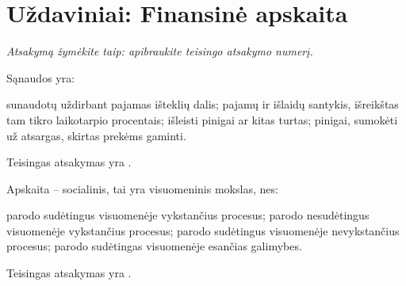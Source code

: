 

\chapter{Uždaviniai: Finansinė apskaita}


\begin{tasks}
  
  \emph{Atsakymą žymėkite taip: apibraukite teisingo atsakymo numerį.}

  \begin{task}
    \begin{condition}
      Sąnaudos yra:
      \begin{enumerate}
         sunaudotų uždirbant pajamas išteklių dalis;
         pajamų ir išlaidų santykis, išreikštas tam tikro
          laikotarpio procentais;
         išleisti pinigai ar kitas turtas;
         pinigai, sumokėti už atsargas, skirtas prekėms
          gaminti.
      \end{enumerate}
    \end{condition}
    \begin{solution}
      Teisingas atsakymas yra .
    \end{solution}
  \end{task}

  \begin{task}
    \begin{condition}
      Apskaita – socialinis, tai yra visuomeninis mokslas, nes:
      \begin{enumerate}
         parodo sudėtingus visuomenėje vykstančius procesus;
         parodo nesudėtingus visuomenėje vykstančius procesus;
         parodo sudėtingus visuomenėje nevykstančius procesus;
         parodo sudėtingas visuomenėje esančias galimybes.
      \end{enumerate}
    \end{condition}
    \begin{solution}
      Teisingas atsakymas yra .
    \end{solution}
  \end{task}


\end{tasks}
